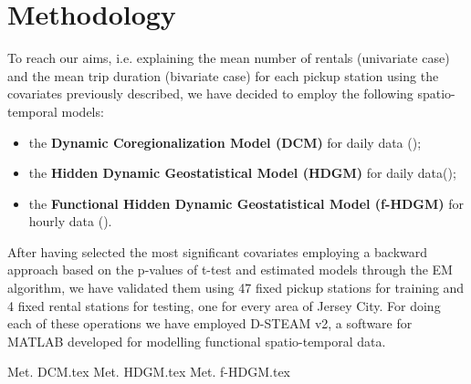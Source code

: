 \section{Methodology}
To reach our aims, i.e. explaining the mean number of rentals (univariate case) and the mean trip duration (bivariate case) for each pickup station using the covariates previously described, we have decided to employ the following spatio-temporal models:
\begin{itemize}
	\item the \textbf{Dynamic Coregionalization Model (DCM)} for daily data (\cite{dcm});
	\item the \textbf{Hidden Dynamic Geostatistical Model (HDGM)} for daily data(\cite{hdgm});
	\item the \textbf{Functional Hidden Dynamic Geostatistical Model (f-HDGM)} for hourly data (\cite{dstem}).
\end{itemize}
After having selected the most significant covariates employing a backward approach based on the p-values of t-test and estimated models through the EM algorithm, we have validated them using \num{47} fixed pickup stations for training and \num{4} fixed rental stations for testing, one for every area of Jersey City. For doing each of these operations we have employed D-STEAM v\num{2}, a software for MATLAB developed for modelling functional spatio-temporal data.

{Met. DCM.tex}
{Met. HDGM.tex}
{Met. f-HDGM.tex}